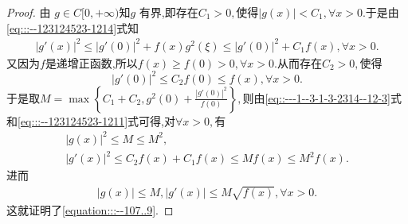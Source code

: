 \documentclass[../../main.tex]{subfiles}
\begin{document}
\begin{proof}
由 \( g\in C[0,+\infty) \)知$g$ 有界,即存在$C_1>0,$使得$|g(x)|<C_1,\forall x>0.$于是由\eqref{eq:::--123124523-1214}式知
\begin{align}
\left| g' (x) \right|^2\leqslant \left| g' (0) \right|^2+f(x)g^2(\xi )\leqslant \left| g' (0) \right|^2+C_1f(x),\forall x>0.\label{eq::---1--3-1-3-2314--12-3}
\end{align}
又因为$f$是递增正函数,所以$f(x)\geqslant f(0)>0,\forall x>0.$从而存在$C_2>0,$使得
$$
|g'(0)|^2\leqslant C_2f(0)\leqslant f(x),\forall x>0.
$$
于是取$M=\max \left\{ C_1+C_2,g^2(0)+\frac{\left| g' (0) \right|^2}{f(0)} \right\},$则由\eqref{eq::---1--3-1-3-2314--12-3}式和\eqref{eq:::--123124523-1211}式可得,对$\forall x>0,$有
\begin{gather*}
\left| g\left( x \right) \right|^2\leqslant M\leqslant M^2,
\\
\left| g' (x) \right|^2\leqslant C_2f\left( x \right) +C_1f(x)\leqslant Mf\left( x \right) \leqslant M^2f\left( x \right) .
\end{gather*}
进而
\begin{align*}
\left| g\left( x \right) \right|\leqslant M,\left| g'(x) \right|\leqslant M\sqrt{f\left( x \right)},\forall x>0.
\end{align*}
这就证明了\eqref{equation:::--107..9}.
\end{proof}
\end{document}
